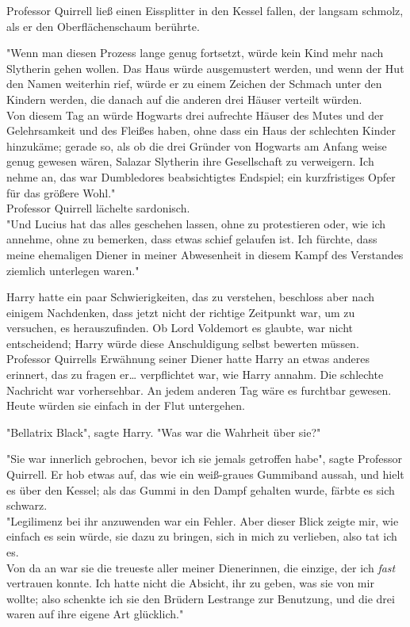 {Professor Quirrell ließ einen Eissplitter in den Kessel fallen, der langsam schmolz, als er den Oberflächenschaum berührte.

"Wenn man diesen Prozess lange genug fortsetzt, würde kein Kind mehr nach Slytherin gehen wollen. Das Haus würde ausgemustert werden, und wenn der Hut den Namen weiterhin rief, würde er zu einem Zeichen der Schmach unter den Kindern werden, die danach auf die anderen drei Häuser verteilt würden.\\ Von diesem Tag an würde Hogwarts drei aufrechte Häuser des Mutes und der Gelehrsamkeit und des Fleißes haben, ohne dass ein Haus der schlechten Kinder hinzukäme; gerade so, als ob die drei Gründer von Hogwarts am Anfang weise genug gewesen wären, Salazar Slytherin ihre Gesellschaft zu verweigern. Ich nehme an, das war Dumbledores beabsichtigtes Endspiel; ein kurzfristiges Opfer für das größere Wohl."\\ Professor Quirrell lächelte sardonisch.\\ "Und Lucius hat das alles geschehen lassen, ohne zu protestieren oder, wie ich annehme, ohne zu bemerken, dass etwas schief gelaufen ist. Ich fürchte, dass meine ehemaligen Diener in meiner Abwesenheit in diesem Kampf des Verstandes ziemlich unterlegen waren."

Harry hatte ein paar Schwierigkeiten, das zu verstehen, beschloss aber nach einigem Nachdenken, dass jetzt nicht der richtige Zeitpunkt war, um zu versuchen, es herauszufinden. Ob Lord Voldemort es glaubte, war nicht entscheidend; Harry würde diese Anschuldigung selbst bewerten müssen. Professor Quirrells Erwähnung seiner Diener hatte Harry an etwas anderes erinnert, das zu fragen er… verpflichtet war, wie Harry annahm. Die schlechte Nachricht war vorhersehbar. An jedem anderen Tag wäre es furchtbar gewesen. Heute würden sie einfach in der Flut untergehen.

"Bellatrix Black", sagte Harry. "Was war die Wahrheit über sie?"

"Sie war innerlich gebrochen, bevor ich sie jemals getroffen habe", sagte Professor Quirrell. Er hob etwas auf, das wie ein weiß-graues Gummiband aussah, und hielt es über den Kessel; als das Gummi in den Dampf gehalten wurde, färbte es sich schwarz.\\ "Legilimenz bei ihr anzuwenden war ein Fehler. Aber dieser Blick zeigte mir, wie einfach es sein würde, sie dazu zu bringen, sich in mich zu verlieben, also tat ich es.\\ Von da an war sie die treueste aller meiner Dienerinnen, die einzige, der ich \emph{fast} vertrauen konnte. Ich hatte nicht die Absicht, ihr zu geben, was sie von mir wollte; also schenkte ich sie den Brüdern Lestrange zur Benutzung, und die drei waren auf ihre eigene Art glücklich."

}
